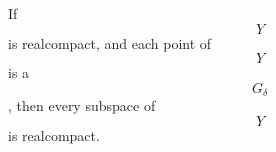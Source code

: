 If $$Y$$ is realcompact, and each point of $$Y$$ is a $$G_{\delta}$$, then every subspace of $$Y$$ is realcompact.
